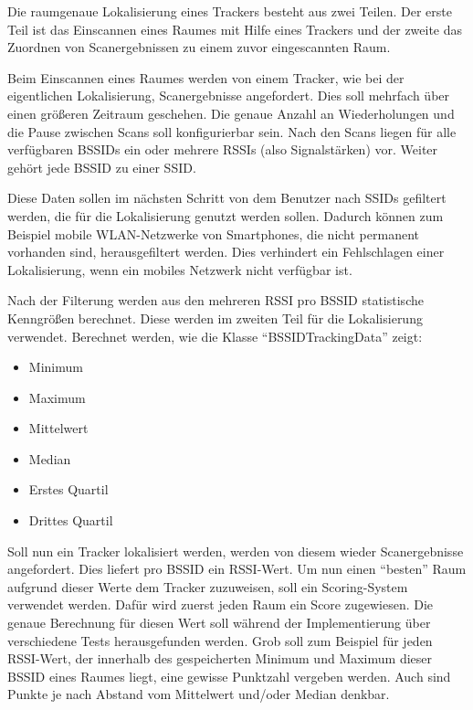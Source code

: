 Die raumgenaue Lokalisierung eines Trackers besteht aus zwei Teilen.
Der erste Teil ist das Einscannen eines Raumes mit Hilfe eines Trackers und der zweite das Zuordnen von Scanergebnissen
zu einem zuvor eingescannten Raum.

Beim Einscannen eines Raumes werden von einem Tracker, wie bei der eigentlichen Lokalisierung, Scanergebnisse angefordert.
Dies soll mehrfach über einen größeren Zeitraum geschehen.
Die genaue Anzahl an Wiederholungen und die Pause zwischen Scans soll konfigurierbar sein.
Nach den Scans liegen für alle verfügbaren \glspl{BSSID} ein oder mehrere \glspl{RSSI} (also Signalstärken) vor.
Weiter gehört jede \gls{BSSID} zu einer \gls{SSID}.

Diese Daten sollen im nächsten Schritt von dem Benutzer nach \glspl{SSID} gefiltert werden, die für die Lokalisierung
genutzt werden sollen.
Dadurch können zum Beispiel mobile \gls{WLAN}-Netzwerke von Smartphones, die nicht permanent vorhanden sind, herausgefiltert werden.
Dies verhindert ein Fehlschlagen einer Lokalisierung, wenn ein mobiles Netzwerk nicht verfügbar ist.

Nach der Filterung werden aus den mehreren \gls{RSSI} pro \gls{BSSID} statistische Kenngrößen berechnet.
Diese werden im zweiten Teil für die Lokalisierung verwendet.
Berechnet werden, wie die Klasse \enquote{BSSIDTrackingData} zeigt:
\begin{itemize}
	\item Minimum
	\item Maximum
	\item Mittelwert
	\item Median
	\item Erstes Quartil
	\item Drittes Quartil
\end{itemize}

Soll nun ein Tracker lokalisiert werden, werden von diesem wieder Scanergebnisse angefordert.
Dies liefert pro \gls{BSSID} ein \gls{RSSI}-Wert.
Um nun einen \enquote{besten} Raum aufgrund dieser Werte dem Tracker zuzuweisen, soll ein Scoring-System verwendet werden.
Dafür wird zuerst jeden Raum ein Score zugewiesen.
Die genaue Berechnung für diesen Wert soll während der Implementierung über verschiedene Tests herausgefunden werden.
Grob soll zum Beispiel für jeden \gls{RSSI}-Wert, der innerhalb des gespeicherten Minimum und Maximum dieser \gls{BSSID}
eines Raumes liegt, eine gewisse Punktzahl vergeben werden.
Auch sind Punkte je nach Abstand vom Mittelwert und/oder Median denkbar.

